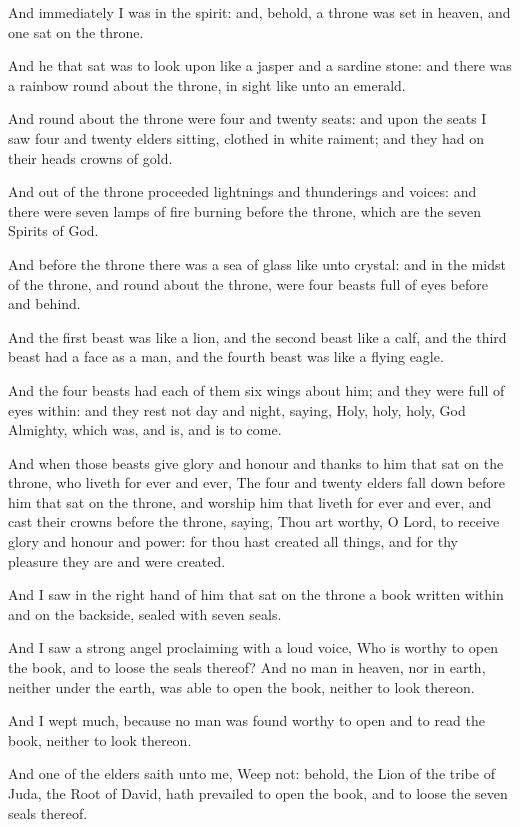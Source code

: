 \Verse And immediately I was in the spirit: and, behold, a throne was set in heaven, and one sat on the throne.

\Verse And he that sat was to look upon like a jasper and a sardine stone: and there was a rainbow round about the throne, in sight like unto an emerald.

\Verse And round about the throne were four and twenty seats: and upon the seats I saw four and twenty elders sitting, clothed in white raiment; and they had on their heads crowns of gold.

\Verse And out of the throne proceeded lightnings and thunderings and voices: and there were seven lamps of fire burning before the throne, which are the seven Spirits of God.

\Verse And before the throne there was a sea of glass like unto crystal: and in the midst of the throne, and round about the throne, were four beasts full of eyes before and behind.

\Verse And the first beast was like a lion, and the second beast like a calf, and the third beast had a face as a man, and the fourth beast was like a flying eagle.

\Verse And the four beasts had each of them six wings about him; and they were full of eyes within: and they rest not day and night, saying, Holy, holy, holy, \LORD God Almighty, which was, and is, and is to come.

\Verse And when those beasts give glory and honour and thanks to him that sat on the throne, who liveth for ever and ever, \Verse The four and twenty elders fall down before him that sat on the throne, and worship him that liveth for ever and ever, and cast their crowns before the throne, saying, \Verse Thou art worthy, O Lord, to receive glory and honour and power: for thou hast created all things, and for thy pleasure they are and were created.

\Chapter
\Verse And I saw in the right hand of him that sat on the throne a book written within and on the backside, sealed with seven seals.

\Verse And I saw a strong angel proclaiming with a loud voice, Who is worthy to open the book, and to loose the seals thereof?  \Verse And no man in heaven, nor in earth, neither under the earth, was able to open the book, neither to look thereon.

\Verse And I wept much, because no man was found worthy to open and to read the book, neither to look thereon.

\Verse And one of the elders saith unto me, Weep not: behold, the Lion of the tribe of Juda, the Root of David, hath prevailed to open the book, and to loose the seven seals thereof.

